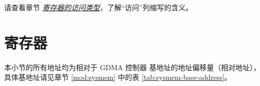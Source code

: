 \documentclass[main\_\_CN.tex]{subfiles}
\begin{document}
请查看章节 \hyperref[glossary-access-types]{\textit{寄存器的访问类型}}，了解“访问”列缩写的含义。






\clearpage
\section{寄存器}

本小节的所有地址均为相对于 GDMA 控制器 基地址的地址偏移量（相对地址），具体基地址请见章节 \ref{mod:sysmem} \textit{} 中的表 \ref{tab:sysmem-base-address}。



\end{document}
